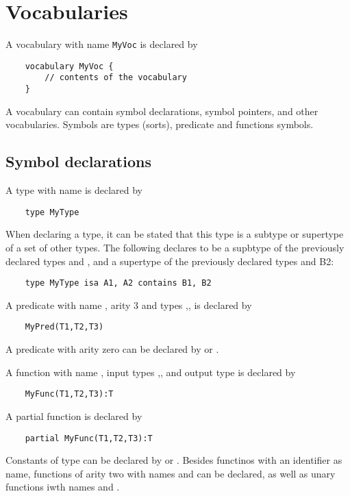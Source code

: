 \section{Vocabularies}
A vocabulary with name {\tt MyVoc} is declared by
\begin{lstlisting}
	vocabulary MyVoc {
		// contents of the vocabulary
	}
\end{lstlisting}
A vocabulary can contain symbol declarations, symbol pointers, and other vocabularies. Symbols are types (sorts), predicate and functions symbols.


\subsection{Symbol declarations}
\label{ssec:symbols}
A type with name  is declared by
\begin{lstlisting}
	type MyType
\end{lstlisting}
When declaring a type, it can be stated that this type is a subtype or supertype of a set of other types.  The following declares  to be a supbtype of the previously declared types  and , and a supertype of the previously declared types  and {B2}:
\begin{lstlisting}
	type MyType isa A1, A2 contains B1, B2
\end{lstlisting}
A predicate with name , arity 3 and types ,, is declared by
\begin{lstlisting}
	MyPred(T1,T2,T3)
\end{lstlisting}

A predicate with arity zero can be declared by  or .

A function with name , input types ,, and output type   is declared by
\begin{lstlisting}
	MyFunc(T1,T2,T3):T
\end{lstlisting}

A partial function is declared by 
\begin{lstlisting}
	partial MyFunc(T1,T2,T3):T
\end{lstlisting}

Constants of type  can be declared by  or .  Besides functinos with an identifier as name, functions of arity two with names \code{+,-,*,/,\%}  and \code{\textasciicircum} can be declared, as well as unary functions iwth names \code{-} and .


